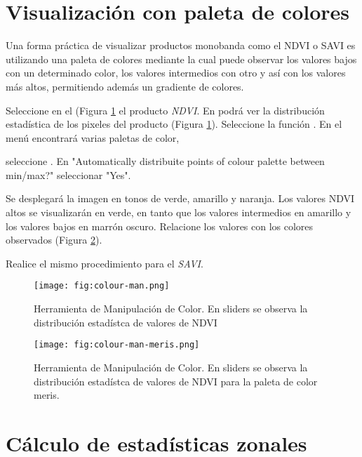 \section{Visualización con paleta de colores}

Una forma práctica de visualizar productos monobanda como el NDVI o SAVI es utilizando una paleta de colores mediante la cual puede observar los valores bajos con un determinado color, los valores intermedios con otro y así con los valores más altos, permitiendo además un gradiente de colores. %

Seleccione en el  (Figura \ref{fig:color-man} el producto \emph{NDVI}. En  podrá ver la distribución estadística de los pixeles del producto (Figura \ref{fig:color-man}). Seleccione la función . En el menú encontrará varias paletas de color,

seleccione  . En "Automatically distribuite points of colour palette between min/max?" seleccionar "Yes".

Se desplegará la imagen en tonos de verde, amarillo y naranja. Los valores NDVI altos se visualizarán en verde, en tanto que los valores intermedios en amarillo y los valores bajos en marrón oscuro. Relacione los valores con los colores observados (Figura \ref{fig:color-man-meris}).

Realice el mismo procedimiento para el \emph{SAVI}.

\begin{figure}[h!]
    \centering
    \texttt{[image: fig:colour-man.png]}
    \caption{Herramienta de Manipulación de Color. En sliders se observa la distribución estadístca de valores de NDVI}
    \label{fig:color-man}
\end{figure}

\begin{figure}[h!]
    \centering
    \texttt{[image: fig:colour-man-meris.png]}
    \caption{Herramienta de Manipulación de Color. En sliders se observa la distribución estadístca de valores de NDVI para la paleta de color meris.}
    \label{fig:color-man-meris}
\end{figure}

\section{Cálculo de estadísticas zonales}

